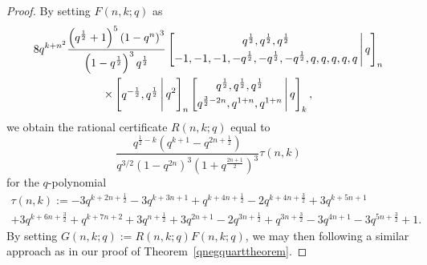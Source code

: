 \documentclass[10pt,a4paper]{amsart}
\begin{document}
\begin{proof}
 By setting $ F(n, k; q)$ as 
\begin{multline*}
 8 q^{k+n^2} 
 \frac{\left(q^{\frac{1}{2}}+1\right)^5 \left(1-q^n\right)^3}{\left(1-q^{\frac{1}{2}}\right)^3 q^{\frac{1}{2}}} 
 \left[ \begin{matrix} q^{\frac{1}{2}}, q^{\frac{1}{2}}, q^{\frac{1}{2}} \vspace{1mm} \\ 
 -1, -1, -1, -q^{\frac{1}{2}}, -q^{\frac{1}{2}}, -q^{\frac{1}{2}}, q, q, q, q, q 
 \end{matrix} \, \Bigg| \, q \right]_{n} \\ 
 \times \left[ \begin{matrix} q^{-\frac{1}{2}}, q^{\frac{1}{2}} 
 \end{matrix} \, \Bigg| \, q^2 \right]_{n} 
 \left[ \begin{matrix} q^{\frac{1}{2}}, q^{\frac{1}{2}}, q^{\frac{1}{2}} \vspace{1mm} \\ 
 q^{\frac{3}{2} - 2 n}, q^{1+n}, q^{1+n} \end{matrix} \, \Bigg| \, q \right]_{k}, 
\end{multline*}
 we obtain the rational certificate $R(n, k; q)$ equal to 
 $$ \frac{q^{\frac{1}{2}-k} \left(q^{k+1}-q^{2 n+\frac{1}{2}}\right)}{ q^{3/2} \left(1-q^{2 
 n}\right)^3 \left(1+q^{\frac{2 n + 1}{2} }\right)^3 } \tau(n, k) $$
 for the $q$-polynomial
\begin{multline*}
 \tau(n, k) := 
 -3 q^{k+2 n+\frac{1}{2}}-3 q^{k+3 n+1}+q^{k+4 n+\frac{1}{2}}-2 q^{k+4 n+\frac{3}{2}} + 
 3 q^{k+5 n+1} \\ 
 + 3 q^{k+6 n+\frac{3}{2}}+q^{k+7 n+2}+3 
 q^{n+\frac{1}{2}}+3 q^{2 n+1}-2 q^{3 n+\frac{1}{2}}+q^{3 n+\frac{3}{2}}-3 q^{4 n+1}-3 q^{5 n+\frac{3}{2}}+1. 
\end{multline*}
 By setting $G(n, k; q) := R(n, k; q) F(n, k; q)$, we may then following a similar approach as in our proof of 
 Theorem~\ref{qnegquarttheorem}. 
\end{proof}
\end{document}
